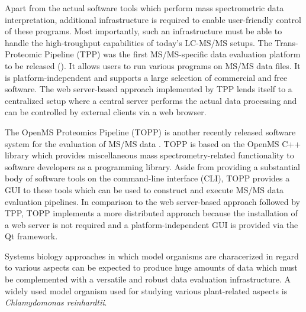 Apart from the actual software tools which perform mass spectrometric data 
interpretation, additional infrastructure is required to enable user-friendly 
control of these programs.
Most importantly, such an infrastructure must be able to handle the 
high-troughput capabilities of today's LC-MS/MS setups.
The Trans-Proteomic Pipeline (TPP) was the first MS/MS-specific data evaluation 
platform to be released (\cite{Keller2005}).
It allows users to run various programs on MS/MS data files.
It is platform-independent and supports a large selection of commercial and
free software.
The web server-based approach implemented by TPP lends itself to a centralized
setup where a central server performs the actual data processing and can
be controlled by external clients via a web browser.

The OpenMS Proteomics Pipeline (TOPP) is another recently released software 
system for the evaluation of MS/MS data \citep{Kohlbacher2007}.
TOPP is based on the OpenMS C++ library which provides miscellaneous mass 
spectrometry-related functionality to software developers as a programming 
library.
Aside from providing a substantial body of software tools on the command-line 
interface (CLI), TOPP provides a GUI to these tools which can be used to
construct and execute MS/MS data evaluation pipelines.
In comparison to the web server-based approach followed by TPP, TOPP implements
a more distributed approach because the installation of a web server is not
required and a platform-independent GUI is provided via the Qt framework.

Systems biology approaches in which model organisms are characerized in
regard to various aspects can be expected to produce huge amounts of data 
which must be complemented with a versatile and robust data evaluation 
infrastructure.
A widely used model organism used for studying various plant-related
aspects is {\em Chlamydomonas reinhardtii}.

